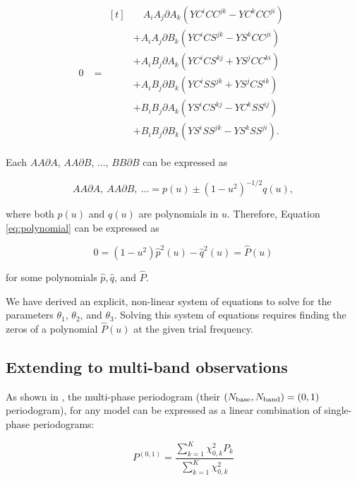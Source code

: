 \documentclass[iop]{emulateapj}
\newcommand{\dA}{\partial A}
\newcommand{\dB}{\partial B}
\begin{document}
\begin{align}\label{eq:polynomial}
0 &= 
\begin{aligned}[t]
&\quad A_iA_j\dA_k\left(YC^iCC^{jk} -  YC^kCC^{ji}\right)\\
&+ A_iA_j\dB_k\left(YC^iCS^{jk} - YS^kCC^{ji}\right)\\
&+ A_iB_j\dA_k\left(YC^iCS^{kj} + YS^jCC^{ki}\right)\\
&+ A_iB_j\dB_k\left(YC^iSS^{jk} + YS^jCS^{ik}\right)\\
&+ B_iB_j\dA_k\left(YS^iCS^{kj} - YC^kSS^{ij}\right)\\
&+ B_iB_j\dB_k\left(YS^iSS^{jk} - YS^kSS^{ji}\right).
\end{aligned}
\end{align}

Each $AA\dA$, $AA\dB$, ..., $BB\dB$ can be expressed as 

\begin{equation}
AA\dA,~AA\dB,~...= p(u) \pm (1 - u^2)^{-1/2}q(u),
\end{equation}

\noindent where both $p(u)$ and $q(u)$ are polynomials in $u$. Therefore, Equation
\ref{eq:polynomial} can be expressed as

\begin{equation}
0 = (1 - u^2)\hat{p}^2(u) - \hat{q}^2(u) = \hat{P}(u)
\end{equation}

\noindent for some polynomials $\hat{p}, \hat{q}$, and $\hat{P}$.


We have derived an explicit, non-linear system of equations to solve for
the parameters $\theta_1$, $\theta_2$, and $\theta_3$. Solving this system of equations
requires finding the zeros of a polynomial $\hat{P}(u)$ at the given trial frequency.

\subsection{Extending to multi-band observations}

As shown in \cite{Vanderplas+Ivezic_2015}, the multi-phase periodogram (their 
$(N_{\rm base}, N_{\rm band}) = (0, 1)$ periodogram), for any model can
be expressed as a linear combination of single-phase periodograms:

\begin{equation}
\label{eq:multiband}
P^{(0,1)} = \frac{\sum_{k=1}^K\chi^2_{0, k}P_{k}}{\sum_{k=1}^K\chi^2_{0,k}}
\end{equation} 
\end{document}
